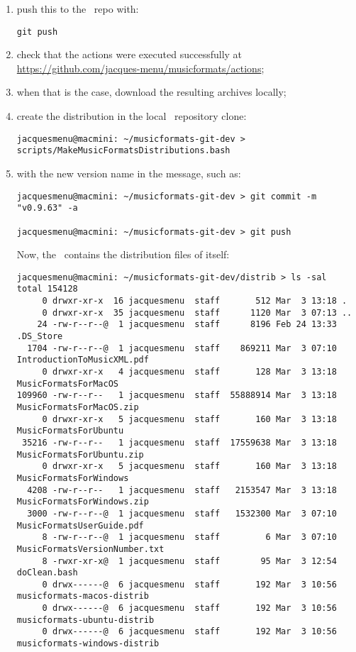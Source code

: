 \begin{enumerate}
\item push this to the \mf\ repo with:
\begin{lstlisting}[language=Terminal]
git push
\end{lstlisting}


\item check that the actions were executed successfully at \url{https://github.com/jacques-menu/musicformats/actions};


\item when that is the case, download the resulting  archives locally;


\item create the distribution in the local \mf\ repository clone:
\begin{lstlisting}[language=Terminal]
jacquesmenu@macmini: ~/musicformats-git-dev > scripts/MakeMusicFormatsDistributions.bash
\end{lstlisting}


\item {} with the new version name in the  message, such as:
\begin{lstlisting}[language=Terminal]
jacquesmenu@macmini: ~/musicformats-git-dev > git commit -m "v0.9.63" -a

jacquesmenu@macmini: ~/musicformats-git-dev > git push
\end{lstlisting}

Now, the \masterBranch\ contains the distribution files of itself:
\begin{lstlisting}[language=TerminalSmall]
jacquesmenu@macmini: ~/musicformats-git-dev/distrib > ls -sal
total 154128
     0 drwxr-xr-x  16 jacquesmenu  staff       512 Mar  3 13:18 .
     0 drwxr-xr-x  35 jacquesmenu  staff      1120 Mar  3 07:13 ..
    24 -rw-r--r--@  1 jacquesmenu  staff      8196 Feb 24 13:33 .DS_Store
  1704 -rw-r--r--@  1 jacquesmenu  staff    869211 Mar  3 07:10 IntroductionToMusicXML.pdf
     0 drwxr-xr-x   4 jacquesmenu  staff       128 Mar  3 13:18 MusicFormatsForMacOS
109960 -rw-r--r--   1 jacquesmenu  staff  55888914 Mar  3 13:18 MusicFormatsForMacOS.zip
     0 drwxr-xr-x   5 jacquesmenu  staff       160 Mar  3 13:18 MusicFormatsForUbuntu
 35216 -rw-r--r--   1 jacquesmenu  staff  17559638 Mar  3 13:18 MusicFormatsForUbuntu.zip
     0 drwxr-xr-x   5 jacquesmenu  staff       160 Mar  3 13:18 MusicFormatsForWindows
  4208 -rw-r--r--   1 jacquesmenu  staff   2153547 Mar  3 13:18 MusicFormatsForWindows.zip
  3000 -rw-r--r--@  1 jacquesmenu  staff   1532300 Mar  3 07:10 MusicFormatsUserGuide.pdf
     8 -rw-r--r--@  1 jacquesmenu  staff         6 Mar  3 07:10 MusicFormatsVersionNumber.txt
     8 -rwxr-xr-x@  1 jacquesmenu  staff        95 Mar  3 12:54 doClean.bash
     0 drwx------@  6 jacquesmenu  staff       192 Mar  3 10:56 musicformats-macos-distrib
     0 drwx------@  6 jacquesmenu  staff       192 Mar  3 10:56 musicformats-ubuntu-distrib
     0 drwx------@  6 jacquesmenu  staff       192 Mar  3 10:56 musicformats-windows-distrib
\end{lstlisting}



\end{enumerate}
